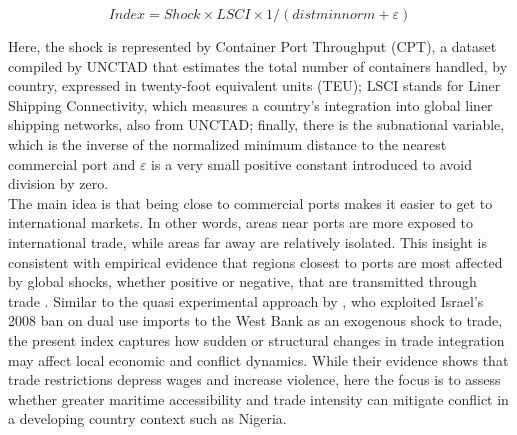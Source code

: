 \begin{equation}
	Index = Shock \times LSCI \times 1/(distminnorm + \varepsilon)
\end{equation}

Here, the shock is represented by Container Port Throughput (CPT), a dataset compiled by UNCTAD that estimates the total number of containers handled, by country, expressed in twenty-foot equivalent units (TEU); LSCI stands for Liner Shipping Connectivity, which measures a country's integration into global liner shipping networks, also from UNCTAD; finally, there is the subnational variable, which is the inverse of the normalized minimum distance to the nearest commercial port and $\varepsilon$ is a very small positive constant introduced to avoid division by zero.\\ 

The main idea is that being close to commercial ports makes it easier to get to international markets. In other words, areas near ports are more exposed to international trade, while areas far away are relatively isolated. This insight is consistent with empirical evidence that regions closest to ports are most affected by global shocks, whether positive or negative, that are transmitted through trade \parencite{berman2015external,mcguirk2020economic}.
Similar to the quasi experimental approach by \textcite{amodio2021security}, who exploited Israel’s 2008 ban on dual use imports to the West Bank as an exogenous shock to trade, the present index captures how sudden or structural changes in trade integration may affect local economic and conflict dynamics. While their evidence shows that trade restrictions depress wages and increase violence, here the focus is to assess whether greater maritime accessibility and trade intensity can mitigate conflict in a developing country context such as Nigeria.\\

